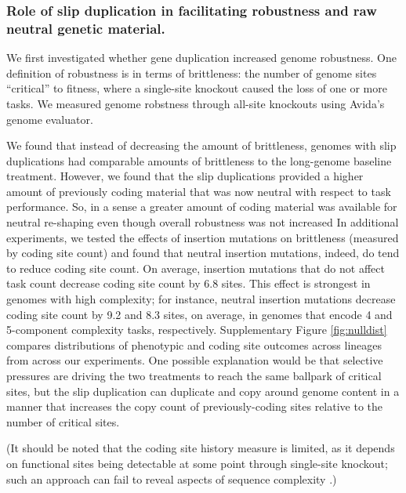 \subsubsection{Role of slip duplication in facilitating robustness and raw neutral genetic material.}



We first investigated whether gene duplication increased genome robustness.
One definition of robustness is in terms of brittleness: the number of genome sites ``critical'' to fitness, where a single-site knockout caused the loss of one or more tasks.
We measured genome robstness through all-site knockouts using Avida's genome evaluator.


We found that instead of decreasing the amount of brittleness, genomes with slip duplications had comparable amounts of brittleness to the long-genome baseline treatment.
However, we found that the slip duplications provided a higher amount of previously coding material that was now neutral with respect to task performance.
So, in a sense a greater amount of coding material was available for neutral re-shaping even though overall robustness was not increased
In additional experiments, we tested the effects of insertion mutations on brittleness (measured by coding site count) and found that neutral insertion mutations, indeed, do tend to reduce coding site count.
On average, insertion mutations that do not affect task count decrease coding site count by 6.8 sites.
This effect is strongest in genomes with high complexity; for instance, neutral insertion mutations decrease coding site count by 9.2 and 8.3 sites, on average, in genomes that encode 4 and 5-component complexity tasks, respectively.
Supplementary Figure \ref{fig:nulldist} compares distributions of phenotypic and coding site outcomes across lineages from across our experiments.
One possible explanation would be that selective pressures are driving the two treatments to reach the same ballpark of critical sites, but the slip duplication can duplicate and copy around genome content in a manner that increases the copy count of previously-coding sites relative to the number of critical sites.

(It should be noted that the coding site history measure is limited, as it depends on functional sites being detectable at some point through single-site knockout; such an approach can fail to reveal aspects of sequence complexity \citep{moreno2024cryptic}.)

